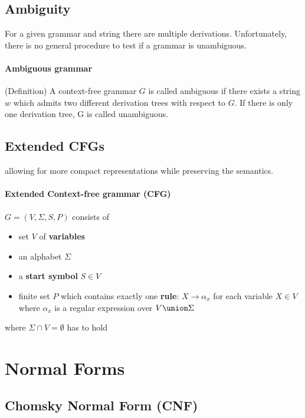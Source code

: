 \documentclass[a3paper, 8pt]{extarticle}
\begin{document}
\begin{multicols*}{6}
\subsection{Ambiguity}
For a given grammar and string  there are multiple derivations. Unfortunately, there is no general procedure to test if a grammar is unambiguous.

\paragraph{Ambiguous grammar} (Definition) A context-free grammar $G$ is called ambiguous if there exists a string $w$ which admits two different derivation trees with respect to $G$.
If there is only one derivation tree, G is called unambiguous.

\subsection{Extended CFGs}  allowing for more compact representations while preserving the semantics.

\paragraph{Extended Context-free grammar (CFG)} $G=(V,\Sigma, S, P)$ consists of  \begin{itemize}
     \item set $V$ of \textbf{variables}
     \item an alphabet $\Sigma$
     \item a \textbf{start symbol} $S \in V$
     \item finite set $P$ which contains exactly one  \textbf{rule}: $X \to \alpha_x$ for each variable $X \in V$ where $\alpha_x$ is a regular expression over $V \union \Sigma$
 \end{itemize}
 where $\Sigma \cap V = \emptyset$ has to hold

\section{Normal Forms} 

\subsection{Chomsky Normal Form (CNF)}


\end{multicols*}
\end{document}
